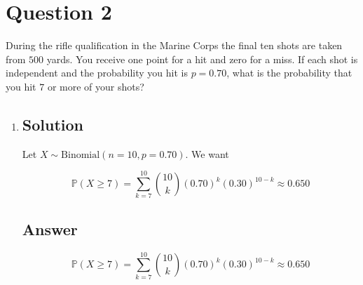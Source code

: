 \documentclass[12pt]{article}
\newcommand{\bP}{\mathbb{P}}
\begin{document}
	
	\section*{Question 2}
	
	\noindent During the rifle qualification in the Marine Corps the final ten shots are taken from $500$ yards. You receive one point for a hit and zero for a miss. If each shot is independent and the probability you hit is $p = 0.70$, what is the probability that you hit $7$ or more of your shots?
	
	\bigskip
	
	\begin{enumerate}[label={},leftmargin=0in]\item
		\subsection*{Solution}
			Let $X\sim\mathrm{Binomial}(n=10,p=0.70)$. We want
			
			\[
				\bP(X\ge7)=\sum_{k=7}^{10}\binom{10}{k}(0.70)^k(0.30)^{10-k}\approx0.650
			\]
		\subsection*{Answer}
		
			\[\boxed{\bP(X\ge7)=\sum_{k=7}^{10}\binom{10}{k}(0.70)^k(0.30)^{10-k}\approx0.650}\]
	\end{enumerate}
	
\end{document}
